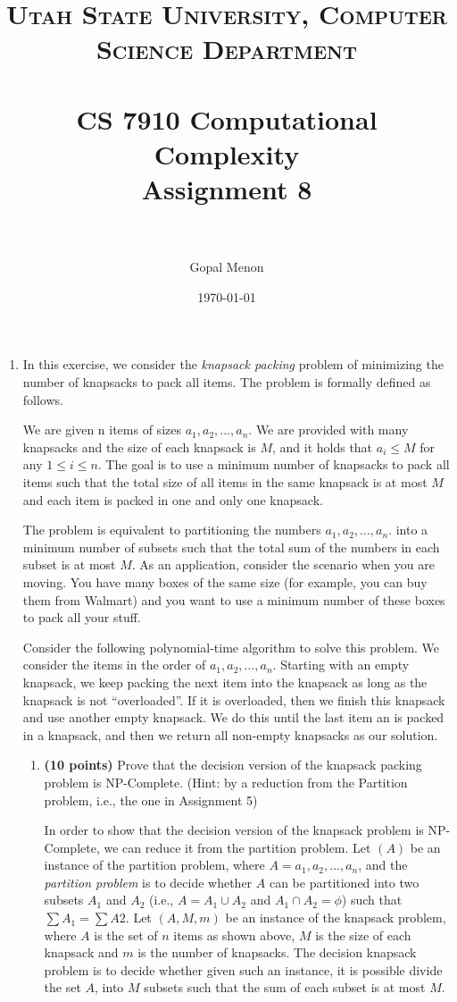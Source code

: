 \documentclass[paper=a4, fontsize=11pt]{scrartcl} %
\title{	
\normalfont \normalsize 
\textsc{Utah State University, Computer Science Department} \\ [25pt] %
\horrule{0.5pt} \\[0.4cm] %
\huge CS 7910 Computational Complexity\\Assignment 8 \\ %
\horrule{2pt} \\[0.5cm] %
}
\author{Gopal Menon} %
\date{\normalsize\today} %
\numberwithin{figure}{section} %
\numberwithin{table}{section} %
\begin{document}
\maketitle %

\begin{enumerate}
\item In this exercise, we consider the \textit{knapsack packing} problem of minimizing the number of knapsacks to pack all items. The problem is formally defined as follows.

We are given n items of sizes $a_1, a_2, . . . , a_n$. We are provided with many knapsacks and the size of each knapsack is $M$, and it holds that $a_i \leq M$ for any $1 \leq i \leq n$. The goal is to use a minimum number of knapsacks to pack all items such that the total size of all items in the same knapsack is at most $M$ and each item is packed in one and only one knapsack.

The problem is equivalent to partitioning the numbers  $a_1, a_2, . . . , a_n$. into a minimum number of subsets such that the total sum of the numbers in each subset is at most $M$. As an application, consider the scenario when you are moving. You have many boxes of the same size (for example, you can buy them from Walmart) and you want to use a minimum number of these boxes to pack all your stuff.

Consider the following polynomial-time algorithm to solve this problem. We consider the items in the order of $a_1, a_2, . . . , a_n$. Starting with an empty knapsack, we keep packing the next item into the knapsack as long as the knapsack is not \enquote{overloaded}. If it is overloaded, then we finish this knapsack and use another empty knapsack. We do this until the last item an is packed in a knapsack, and then we return all non-empty knapsacks as our solution.

\begin{enumerate}
\item \textbf{(10 points)} Prove that the decision version of the knapsack packing problem is NP-Complete. (Hint: by a reduction from the Partition problem, i.e., the one in Assignment 5)

In order to show that the decision version of the knapsack problem is NP-Complete, we can reduce it from the partition problem. Let $(A)$ be an instance of the partition problem, where $A=a_1, a_2, . . . , a_n$, and the \emph{partition problem} is to decide whether $A$ can be partitioned into two subsets $A_1$ and $A_2$ (i.e., $A=A_1 \cup A_2$ and $A_1 \cap A_2 = \phi$) such that $\sum A_1 = \sum A2$. Let $(A, M, m)$ be an instance of the knapsack problem, where $A$ is the set of $n$ items as shown above, $M$ is the size of each knapsack and $m$ is the number of knapsacks. The decision knapsack problem is to decide whether given such an instance, it is possible divide the set $A$, into $M$ subsets such that the sum of each subset is at most $M$.


\end{enumerate}
\end{enumerate}
\end{document}
